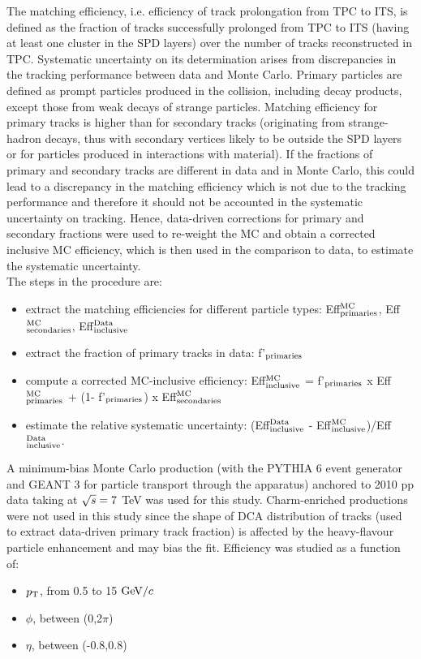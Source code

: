 The matching efficiency, i.e. efficiency of track prolongation from TPC to ITS, 
is defined as the fraction of tracks successfully prolonged from TPC to ITS (having
at least one cluster in the SPD layers)
over the number of tracks reconstructed in TPC.
Systematic uncertainty on its determination arises from discrepancies 
in the tracking performance between data and Monte Carlo.
Primary particles are defined as 
prompt particles produced in the collision, including decay products, 
except those from weak decays of strange particles. Matching efficiency for primary tracks is higher than 
for secondary tracks (originating from strange-hadron decays, thus 
with secondary vertices likely to be outside the SPD layers or for particles produced
in interactions with material). 
If the fractions of primary and secondary tracks are different in data 
and in Monte Carlo, this could lead to a discrepancy in the matching efficiency
which is not due to the tracking performance and therefore it should not be
accounted in the systematic uncertainty on tracking. Hence,
data-driven corrections for primary and secondary fractions were used to re-weight the MC
and obtain a corrected inclusive MC efficiency, which is then used in the
comparison to data, to estimate the systematic uncertainty.\\
The steps in the procedure are:
\begin{itemize}
\item extract the matching efficiencies for different particle types: 
Eff$^{\rm MC}_{\rm primaries}$, Eff$^{\rm MC}_{\rm secondaries}$, Eff$^{\rm Data}_{\rm inclusive}$
\item extract the fraction of primary tracks in data: f'$_{\rm primaries}$
\item compute a corrected MC-inclusive efficiency: 
Eff$^{\rm MC}_{\rm inclusive}$ = f'$_{\rm primaries}$ x Eff$^{\rm MC}_{\rm primaries}$ + (1- f'$_{\rm primaries}$) x Eff$^{\rm MC}_{\rm secondaries}$
\item estimate the relative systematic uncertainty: 
(Eff$^{\rm Data}_{\rm inclusive}$ - Eff$^{\rm MC}_{\rm inclusive}$)/Eff$^{\rm Data}_{\rm inclusive}$.
\end{itemize}
A minimum-bias Monte Carlo production (with the PYTHIA 6 event generator and
GEANT 3 for particle transport through the apparatus) anchored to 2010 pp data taking at 
$\sqrt{s} = 7$ TeV was used for this study. Charm-enriched productions were not used in this study 
since the shape of DCA distribution of tracks (used to extract data-driven 
primary track fraction) is affected by the heavy-flavour particle enhancement
and may bias the fit.
Efficiency was studied as a function of:
\begin{itemize}
\item $p_{\rm T}$, from 0.5 to 15 $\mathrm{GeV}/c$
\item $\phi$, between (0,2$\pi$)
\item $\eta$, between (-0.8,0.8)
\end{itemize}

